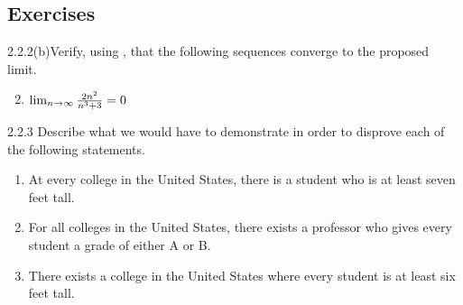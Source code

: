 \renewcommand{\theenumi}{\alph{enumi}}
\renewcommand{\labelenumi}{(\theenumi)}
\subsection{Exercises}

\begin{exercise}
    {2.2.2(b)}Verify, using , that
    the following sequences converge to the proposed limit.
    \begin{enumerate}
        \setcounter{enumi}{1}
        \item \(\lim_{n \rightarrow \infty}\frac{2n^2}{n^3+3} = 0\)
    \end{enumerate}
\end{exercise}


\begin{exercise}
    {2.2.3} Describe what we would have to demonstrate in order to disprove each of the following statements.
    \begin{enumerate}
        \item At every college in the United States, there is a student who is at least
              seven feet tall.
        \item For all colleges in the United States, there exists a professor who gives every student a grade of either A or B.
        \item There exists a college in the United States where every student is at least six feet tall.
    \end{enumerate}
\end{exercise}

